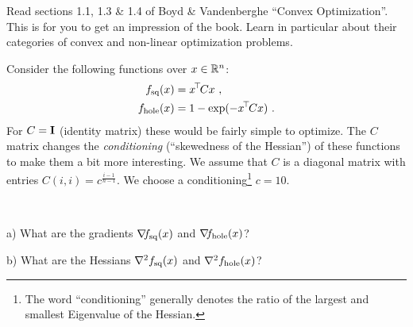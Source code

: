 

\renewcommand{\course}{Optimization}
\renewcommand{\coursepicture}{optim}
\renewcommand{\coursedate}{Summer 2015}
\renewcommand{\exnum}{1}

\exercises
{}
\exercisestitle



Read sections 1.1, 1.3 \& 1.4 of Boyd \& Vandenberghe ``Convex
Optimization''. This is for you to get an impression of the
book. Learn in particular about their categories of convex and
non-linear optimization problems.



Consider the following functions over $x\in{\mathbb{R}}^n$:
\begin{align}
f_\text{sq}(x)
 &= x^{\!\top\!} C x ~,\\
f_\text{hole}(x)
 &= 1-\exp(-x^{\!\top\!} C x) ~.
\end{align}
For $C={\rm\bf I}$ (identity matrix) these would be fairly simple to
optimize. The $C$ matrix changes the \emph{conditioning} (``skewedness
of the Hessian'') of these functions to make them a bit more
interesting. We assume that $C$ is a diagonal matrix with entries $C(i,i) =
c^{\frac{i-1}{n-1}}$. We choose a conditioning\footnote{The
word ``conditioning'' generally denotes the ratio of the largest and
smallest Eigenvalue of the Hessian.} $c=10$.

~

a) What are the gradients ${\nabla_{\!\!}} f_{\text{sq}}(x)$ and
${\nabla_{\!\!}} f_{\text{hole}}(x)$?

b) What are the Hessians ${\nabla_{\!\!}^2} f_{\text{sq}}(x)$ and
${\nabla_{\!\!}^2} f_{\text{hole}}(x)$?

